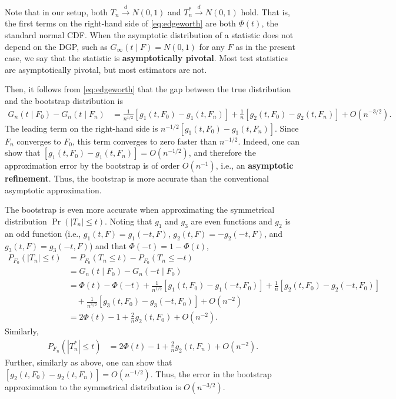 \documentclass[10.5pt, A4paper, openany, uplatex]{book}
\numberwithin{equation}{section}
\begin{document}
Note that in our setup, both $T_n \overset{d}{\to} N(0,1)$ and $T_n^* \overset{d}{\to} N(0,1)$ hold.
That is, the first terms on the right-hand side of \eqref{eq:edgeworth} are both $\Phi(t)$, the standard normal CDF.
When the asymptotic distribution of a statistic does not depend on the DGP, such as $G_\infty(t \mid F) = N(0,1)$ for any $F$ as in the present case, we say that the statistic is \textbf{asymptotically pivotal}.
Most test statistics are asymptotically pivotal, but most estimators are not.

Then, it follows from \eqref{eq:edgeworth} that the gap between the true distribution and the bootstrap distribution is 
\begin{align*}
	G_n(t \mid F_0) - G_n(t \mid F_n) 
	& = \frac{1}{n^{1/2}}[g_1(t, F_0) - g_1(t, F_n)] + \frac{1}{n}[g_2(t, F_0) - g_2(t, F_n)] + O(n^{-3/2}).
\end{align*}
The leading term on the right-hand side is $n^{-1/2}[g_1(t, F_0) - g_1(t, F_n)]$.
Since $F_n$ converges to $F_0$, this term converges to zero faster than $n^{-1/2}$.
Indeed, one can show that $[g_1(t, F_0) - g_1(t, F_n)] = O(n^{-1/2})$, and therefore the approximation error by the bootstrap is of order $O(n^{-1})$, i.e., an \textbf{asymptotic refinement}.
Thus, the bootstrap is more accurate than the conventional asymptotic approximation.
\bigskip

The bootstrap is even more accurate when approximating the symmetrical distribution $\Pr(|T_n| \le t)$.
Noting that $g_1$ and $g_3$ are even functions and $g_2$ is an odd function (i.e., $g_1(t, F) = g_1(-t, F)$, $g_2(t, F) = - g_2(-t, F)$, and $g_3(t, F) = g_3(-t, F)$) and that $\Phi(-t) = 1 - \Phi(t)$,
\begin{align*}
	P_{F_0}(|T_n| \le t) 
	& = P_{F_0}(T_n \le t) -  P_{F_0}(T_n \le - t) \\
	& = G_n(t \mid F_0) - G_n( - t \mid F_0) \\
	& = \Phi(t) - \Phi(-t) + \frac{1}{n^{1/2}}[g_1(t, F_0) - g_1(-t, F_0)] + \frac{1}{n}[g_2(t, F_0) - g_2(-t, F_0)] \\
	& \quad + \frac{1}{n^{3/2}} [g_3(t, F_0) - g_3(-t, F_0)] + O(n^{-2}) \\
	& = 2 \Phi(t) - 1 + \frac{2}{n}g_2(t, F_0) + O(n^{-2}).
\end{align*}
Similarly,
\begin{align*}
	P_{F_n}(|T_n^*| \le t) 
	& = 2 \Phi(t) - 1 + \frac{2}{n}g_2(t, F_n) + O(n^{-2}).
\end{align*}
Further, similarly as above, one can show that $[g_2(t, F_0) - g_2(t, F_n)] = O(n^{-1/2})$.
Thus, the error in the bootstrap approximation to the symmetrical distribution is $O(n^{-3/2})$.
\end{document}
